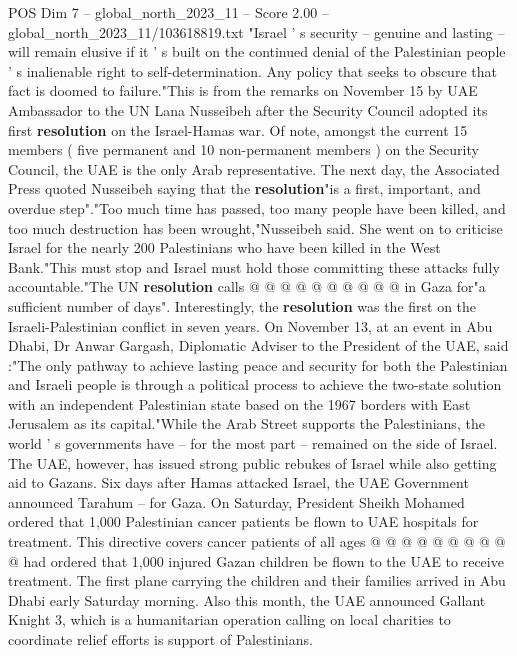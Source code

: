 \begin{textsample}{POS Dim 7 – global\_north\_2023\_11 – Score 2.00 – global\_north\_2023\_11/103618819.txt}  \label{ex:f7_pos_405}
"Israel ' s security -- genuine and lasting -- will remain elusive if it ' s built on the continued denial of the Palestinian people ' s inalienable right to self-determination.
Any policy that seeks to obscure that fact is doomed to failure."This is from the remarks on November 15 by UAE Ambassador to the UN Lana Nusseibeh after the Security Council adopted its first \textbf{resolution} on the Israel-Hamas war.
Of note, amongst the current 15 members ( five permanent and 10 non-permanent members ) on the Security Council, the UAE is the only Arab representative.
The next day, the Associated Press quoted Nusseibeh saying that the \textbf{resolution}"is a first, important, and overdue step"."Too much time has passed, too many people have been killed, and too much destruction has been wrought,"Nusseibeh said.
She went on to criticise Israel for the nearly 200 Palestinians who have been killed in the West Bank."This must stop and Israel must hold those committing these attacks fully accountable."The UN \textbf{resolution} calls @ @ @ @ @ @ @ @ @ @ in Gaza for"a sufficient number of days".
Interestingly, the \textbf{resolution} was the first on the Israeli-Palestinian conflict in seven years.
On November 13, at an event in Abu Dhabi, Dr Anwar Gargash, Diplomatic Adviser to the President of the UAE, said :"The only pathway to achieve lasting peace and security for both the Palestinian and Israeli people is through a political process to achieve the two-state solution with an independent Palestinian state based on the 1967 borders with East Jerusalem as its capital."While the Arab Street supports the Palestinians, the world ' s governments have -- for the most part -- remained on the side of Israel.
The UAE, however, has issued strong public rebukes of Israel while also getting aid to Gazans.
Six days after Hamas attacked Israel, the UAE Government announced Tarahum -- for Gaza.
On Saturday, President Sheikh Mohamed ordered that 1,000 Palestinian cancer patients be flown to UAE hospitals for treatment.
This directive covers cancer patients of all ages @ @ @ @ @ @ @ @ @ @ had ordered that 1,000 injured Gazan children be flown to the UAE to receive treatment.
The first plane carrying the children and their families arrived in Abu Dhabi early Saturday morning.
Also this month, the UAE announced Gallant Knight 3, which is a humanitarian operation calling on local charities to coordinate relief efforts is support of Palestinians.

\end{textsample}
